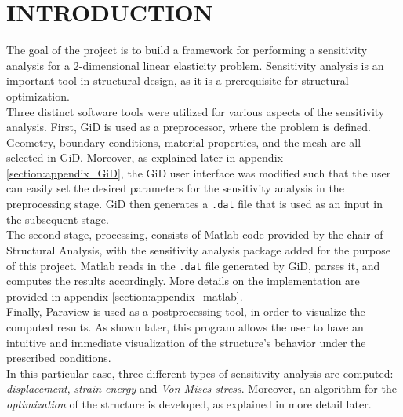 

\section{INTRODUCTION}
The goal of the project is to build a framework for performing a sensitivity analysis for a 2-dimensional linear elasticity problem. Sensitivity analysis is an important tool in structural design, as it is a prerequisite for structural optimization.
\\[3pt]
Three distinct software tools were utilized for various aspects of the sensitivity analysis. First, GiD is used as a preprocessor, where the problem is defined. Geometry, boundary conditions, material properties, and the mesh are all selected in GiD. Moreover, as explained later in appendix \ref{section:appendix_GiD}, the GiD user interface was modified such that the user can easily set the desired parameters for the sensitivity analysis in the preprocessing stage. GiD then generates a \texttt{.dat} file that is used as an input in the subsequent stage.
\\[3pt]
The second stage, processing, consists of Matlab code provided by the chair of Structural Analysis, with the sensitivity analysis package added for the purpose of this project. Matlab reads in the \texttt{.dat} file generated by GiD, parses it, and computes the results accordingly. More details on the implementation are provided in appendix \ref{section:appendix_matlab}. \\[3pt]
Finally, Paraview is used as a postprocessing tool, in order to visualize the computed results. As shown later, this program allows the user to have an intuitive and immediate visualization of the structure's behavior under the prescribed conditions.\\[3pt]
In this particular case, three different types of sensitivity analysis are computed: \textit{displacement}, \textit{strain energy} and \textit{Von Mises stress}.  Moreover, an algorithm for the \textit{optimization} of the structure is developed, as explained in more detail later.\\[3pt]
